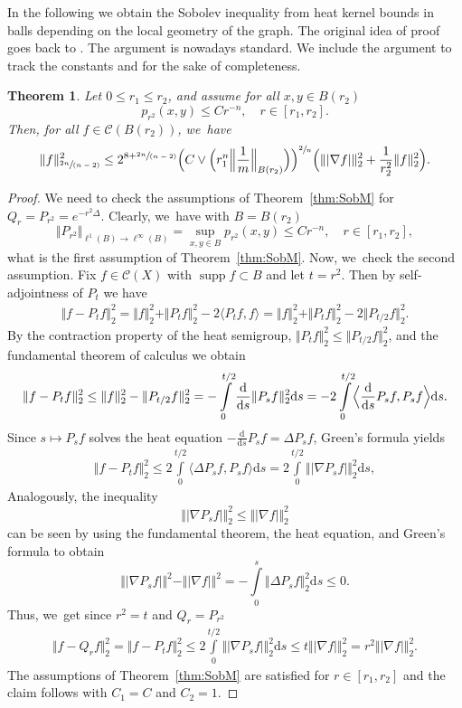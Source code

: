 \documentclass[10pt]{amsart}
\newcommand{\spfrac}[2]{\sfrac{#1}{(#2)}}
\theoremstyle{plain}
\newtheorem{theorem}{Theorem}[section]
\theoremstyle{definition}
\newcommand{\cC}{\mathcal{C}}
\newcommand{\drm}{\mathrm{d}}
\DeclareMathOperator{\supp}{supp}
\let\oldint\int
\renewcommand{\int}{\oldint\limits}
\begin{document}
In the following we obtain the Sobolev inequality from heat kernel bounds in balls depending on the local geometry of the graph. The original idea of proof goes back to \cite{Varopoulos-85}. The argument is nowadays standard. We include the argument to track the constants and for the sake of completeness.

\begin{theorem}\label{lem:heattoS}
Let $0\leq r_1\leq r_2$, and assume for all $x,y\in B(r_2)$
\[
p_{r^2}(x,y)\leq Cr^{-n}, \quad r\in [r_1,r_2].
\]
Then, for all {$f\in\cC( B(r_{2}))$}, we~have
\begin{align*}
\Vert f\Vert_{\spfrac{2n}{n-2}}^2
\leq 2^{8+\spfrac{2n}{n-2}}
\Bigl(C\vee \Bigl(r_1^{n} \Bigl\Vert\frac1m\Bigr\Vert_{B(r_2)}\Bigr)\Bigr)^{\sfrac{2}{n}}
\Bigl(\Vert \vert\nabla f\vert\Vert_2^2+\frac{1}{r_2^2}\Vert f\Vert_2^2\Bigr).
\end{align*}
\end{theorem}
\begin{proof}
We need to check the assumptions of Theorem~\ref{thm:SobM} for $Q_r=P_{r^{2}}=e^{-r^2\Delta}$.
Clearly, we~have with $ B=B(r_2) $
\[
\Vert P_{r^2}\Vert_{\ell^1(B)\to\ell^\infty(B)}=\sup_{x,y\in B}p_{r^2}(x,y)\leq C r^{-n}, \quad r\in [r_1,r_2],
\]
what is the first assumption of Theorem~\ref{thm:SobM}.
Now, we~check the second assumption. Fix $f\in \cC(X)$ with $\supp f\subset B$ and let $ t=r^{2} $. Then by self-adjointness of $P_t$
we have
\begin{align*}
\Vert f-P_tf\Vert_2^2=\Vert f\Vert_2^2+\Vert P_tf\Vert_2^2-2\langle P_tf,f\rangle
=\Vert f\Vert_2^2+\Vert P_tf\Vert_2^2-2\Vert P_{t/2}f\Vert_2^2.
\end{align*}
By the contraction property of the heat semigroup, \ie $\Vert P_tf\Vert_2^2\leq \Vert P_{t/2}f\Vert_2^2$, and the fundamental theorem of calculus we obtain
\begin{align*}
\Vert f-P_tf\Vert_2^2
\leq \Vert f\Vert_2^2-\Vert P_{t/2}f\Vert_2^2=-\int_0^{t/2}\frac{\drm }{\drm s}\Vert P_sf\Vert_2^2\drm s
=-2\int_0^{t/2}\Bigl\langle \frac{\drm }{\drm s}P_sf,P_sf\Bigr\rangle\drm s.
\end{align*}
Since $s\mapsto P_sf$ solves the heat equation $ -\frac{\drm }{\drm s}P_sf=\Delta P_sf $, Green's formula yields
\begin{align*}
\Vert f-P_tf\Vert_2^2
\leq
2\int_0^{t/2}\langle \Delta P_sf,P_sf\rangle\drm s
=2\int_0^{t/2}\Vert |\nabla P_sf |\Vert_2^2\drm s,
\end{align*}
Analogously, the inequality
\[
\Vert |\nabla P_sf|\Vert_2^2\leq \Vert|\nabla f|\Vert_2^2
\]
can be seen by using the fundamental theorem, the heat equation, and Green's formula to obtain
\[
\Vert |\nabla P_sf|\Vert^2- \Vert|\nabla f|\Vert^2
=-\int_0^s \Vert \Delta P_sf\Vert_2^2\drm s
\leq 0.
\]
Thus, we~get since $r^{2}=t$ and $ Q_{r}=P_{r^{2}} $
\begin{align*}
\Vert f-Q_{r}f\Vert_2^2=\Vert f-P_{t}f\Vert_2^2
\leq
2\int_0^{t/2}\Vert |\nabla P_sf|\Vert_2^2\drm s
\leq t\Vert |\nabla f|\Vert_2^2=r^2\Vert |\nabla f|\Vert_2^2.
\end{align*}
The assumptions of {Theorem~\ref{thm:SobM}} are satisfied for $r\in[r_1,r_2]$ and the claim follows with $C_1=C$ and $C_2=1$.
\end{proof}
\end{document}
